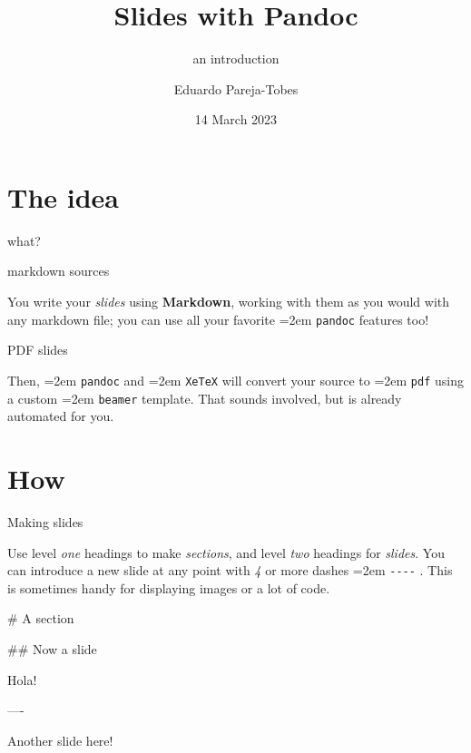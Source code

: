 \documentclass[10pt,compress]{beamer}
\title{Slides with Pandoc}
\subtitle{an introduction}
\author{Eduardo Pareja-Tobes}
\date{14 March 2023}
\institute{
  \href{http://era7bioinformatics.com}{{Era7} {\color{Grey-Light}bioinformatics}} - {\color{Salmon-Dark}oh}{\color{LightAmber-Dark}no}{\color{Grey}sequences}{\color{Salmon-Dark}!}
}
\makeatletter
\newenvironment{Shaded}{\vspace{\baselineskip}\begin{shaded}}{\end{shaded}\vspace{\baselineskip}}
\newcommand{\FunctionTok}[1]{\textcolor{solarized@base1}{#1}}
\newcommand{\NormalTok}[1]{\textcolor{solarized@base00}{#1}}
\let\OldTexttt\texttt
\renewcommand{\texttt}[1]{ \emergencystretch=2em \OldTexttt{#1} }
\makeatother
\begin{document}
\maketitle


% 
\section{The idea}\label{the-idea}

\begin{frame}{what?}

\begin{block}{markdown sources}

You write your \emph{slides} using \textbf{Markdown}, working with them
as you would with any markdown file; you can use all your favorite
\texttt{pandoc} features too!

\end{block}

\begin{block}{PDF slides}

Then, \texttt{pandoc} and \texttt{XeTeX} will convert your source to
\texttt{pdf} using a custom \texttt{beamer} template. That sounds
involved, but is already automated for you.

\end{block}

\end{frame}

\section{How}\label{how}

\begin{frame}[fragile]{Making slides}

Use level \emph{one} headings to make \emph{sections}, and level
\emph{two} headings for \emph{slides}. You can introduce a new slide at
any point with \emph{4} or more dashes \texttt{-\/-\/-\/-}. This is
sometimes handy for displaying images or a lot of code.

\begin{Shaded}
\begin{Highlighting}[]
\FunctionTok{# A section}

\FunctionTok{## Now a slide}

\NormalTok{Hola!}

\NormalTok{----}

\NormalTok{Another slide here!}
\end{Highlighting}
\end{Shaded}

\end{frame}
\end{document}
